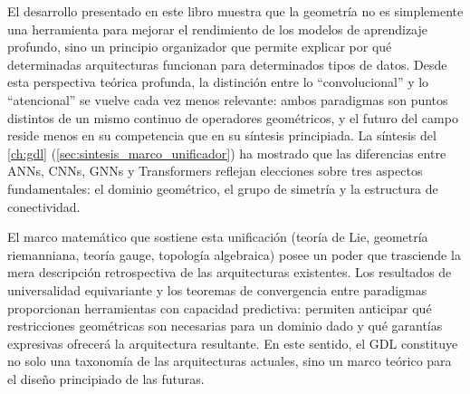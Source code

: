El desarrollo presentado en este libro muestra que la geometría no es simplemente una herramienta para mejorar el rendimiento de los modelos de aprendizaje profundo, sino un principio organizador que permite explicar por qué determinadas arquitecturas funcionan para determinados tipos de datos. Desde esta perspectiva teórica profunda, la distinción entre lo ``convolucional'' y lo ``atencional'' se vuelve cada vez menos relevante: ambos paradigmas son puntos distintos de un mismo continuo de operadores geométricos, y el futuro del campo reside menos en su competencia que en su síntesis principiada. La síntesis del \autoref{ch:gdl} (\autoref{sec:sintesis_marco_unificador}) ha mostrado que las diferencias entre \glspl{ANN}, \glspl{CNN}, \glspl{GNN} y \glspl{Transformer} reflejan elecciones sobre tres aspectos fundamentales: el dominio geométrico, el grupo de simetría y la estructura de conectividad.

El marco matemático que sostiene esta unificación (teoría de Lie, geometría riemanniana, teoría gauge, topología algebraica) posee un poder que trasciende la mera descripción retrospectiva de las arquitecturas existentes. Los resultados de universalidad equivariante y los teoremas de convergencia entre paradigmas proporcionan herramientas con capacidad predictiva: permiten anticipar qué restricciones geométricas son necesarias para un dominio dado y qué garantías expresivas ofrecerá la arquitectura resultante. En este sentido, el \gls{GDL} constituye no solo una taxonomía de las arquitecturas actuales, sino un marco teórico para el diseño principiado de las futuras.
